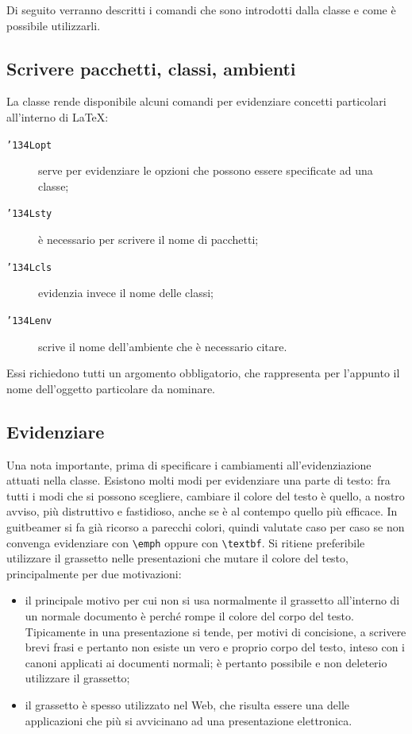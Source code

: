 \documentclass[a4paper,10pt]{article}
\newcommand{\lcap}{{\fontencoding{T1}\selectfont\guillemotleft}}
\newcommand{\rcap}{{\fontencoding{T1}\selectfont\guillemotright}}
\newcommand{\Cap}[1]{\lcap #1\rcap}
\newcommand{\bs}{{\char'134}}%
\newcommand{\pkg}[1]{\textsf{#1}}
\let\cls\pkg
\newcommand{\cmd}[1]{\texttt{\bs #1}}
\begin{document}
Di seguito verranno descritti i comandi che sono introdotti dalla
classe e come è possibile utilizzarli.

\subsection{Scrivere pacchetti, classi, ambienti}
La classe rende disponibile alcuni comandi per evidenziare concetti
particolari all'interno di \LaTeX:
\begin{description}
	\item[\cmd{Lopt}]serve per evidenziare le opzioni che
		possono essere specificate ad una classe;
	\item[\cmd{Lsty}]è necessario per scrivere il nome di
	  pacchetti;
	\item[\cmd{Lcls}]evidenzia invece il nome delle classi;
	\item[\cmd{Lenv}]scrive il nome dell'ambiente che è
		necessario citare.
\end{description}
Essi richiedono tutti un argomento obbligatorio, che rappresenta per
l'appunto il nome dell'oggetto particolare da nominare.

\subsection{Evidenziare}
Una nota importante, prima di specificare i cambiamenti
all'evidenziazione attuati nella classe. Esistono molti modi per
evidenziare una parte di testo: fra tutti i modi che si possono
scegliere, cambiare il colore del testo è quello, a nostro avviso, più
\Cap{distruttivo} e fastidioso, anche se è al contempo quello più
efficace. In \cls{guitbeamer} si fa già ricorso a parecchi colori,
quindi valutate caso per caso se non convenga evidenziare con
\verb+\emph+ oppure con \verb+\textbf+. Si ritiene preferibile
utilizzare il grassetto nelle presentazioni che mutare il colore del
testo, principalmente per due motivazioni:
\begin{itemize}
  \item il principale motivo per cui non si usa normalmente il
    grassetto all'interno di un normale documento è perché \Cap{rompe
    il colore del corpo del testo}. Tipicamente in una presentazione
    si tende, per motivi di concisione, a scrivere brevi frasi e
    pertanto non esiste un vero e proprio corpo del testo, inteso con
    i canoni applicati ai documenti normali; è pertanto possibile e
    non deleterio utilizzare il grassetto;
  \item il grassetto è spesso utilizzato nel Web, che risulta essere
    una delle applicazioni che più si avvicinano ad una presentazione
    elettronica.
\end{itemize}
\end{document}
